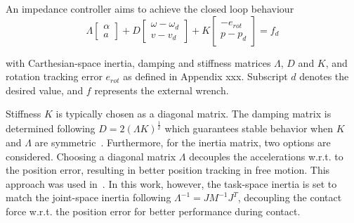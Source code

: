\documentclass[a4paper, 10pt, conference]{ieeeconf}
\begin{document}
     An impedance controller aims to achieve the closed loop behaviour
         \begin{equation} \label{eq:impedance_desired}
     \Lambda  \begin{bmatrix} \alpha   \\ a  \end{bmatrix} + D \begin{bmatrix} \omega - {\omega_d} \\ v - v_d \end{bmatrix}  + K \begin{bmatrix} -e_{rot} \\p - {p_d}  \end{bmatrix} = f_d
     \end{equation} 

    with Carthesian-space inertia, damping and stiffness matrices $\Lambda$, $D$ and $K$, and rotation tracking error $e_{rot}$ as defined in Appendix xxx. Subscript $d$ denotes the desired value, and $f$ represents the external wrench.

    Stiffness $K$ is typically chosen as a diagonal matrix. The damping matrix is determined following $D = 2(\Lambda K)^{\frac{1}{2}}$ which guarantees stable behavior when $K$ and $\Lambda$ are symmetric~\cite{albu-schafferCartesianImpedanceControl2003}. Furthermore, for the inertia matrix, two options are considered. Choosing a diagonal matrix $\Lambda$ decouples the accelerations w.r.t. to the position error, resulting in better position tracking in free motion. This approach was used in~\cite{vanoorschotDesignNumericalValidation2022}. In this work, however, the task-space inertia is set to match the joint-space inertia following $\Lambda^{-1} = JM^{-1}J^T$, decoupling the contact force w.r.t. the position error for better performance during contact.
\end{document}
